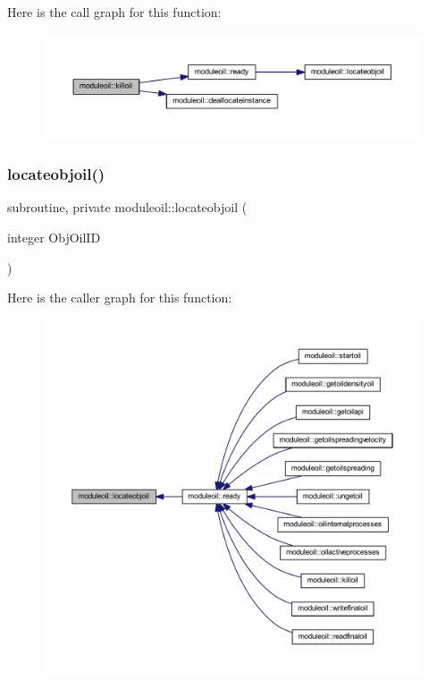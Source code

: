 Here is the call graph for this function\+:\nopagebreak
\begin{figure}[H]
\begin{center}
\leavevmode
\includegraphics[width=350pt]{namespacemoduleoil_a3515505fcda962cedd51dd5986ff6777_cgraph}
\end{center}
\end{figure}
\mbox{\label{namespacemoduleoil_aa0854458437dd99f9ef2103ed4f048b4}} 
\subsubsection{\texorpdfstring{locateobjoil()}{locateobjoil()}}
{\footnotesize\ttfamily subroutine, private moduleoil\+::locateobjoil (\begin{DoxyParamCaption}\item[{integer}]{Obj\+Oil\+ID }\end{DoxyParamCaption})\hspace{0.3cm}{\ttfamily [private]}}

Here is the caller graph for this function\+:\nopagebreak
\begin{figure}[H]
\begin{center}
\leavevmode
\includegraphics[width=350pt]{namespacemoduleoil_aa0854458437dd99f9ef2103ed4f048b4_icgraph}
\end{center}
\end{figure}
\mbox{\label{namespacemoduleoil_a2e2c8b7a65ec01bb12cb4ae2225bc7e2}} 
